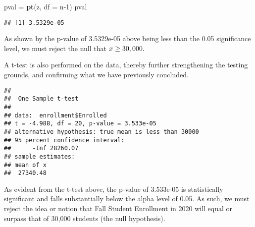 \documentclass[
]{article}
\newenvironment{Shaded}{\begin{snugshade}}{\end{snugshade}}
\newcommand{\CommentTok}[1]{\textcolor[rgb]{0.56,0.35,0.01}{\textit{#1}}}
\newcommand{\DataTypeTok}[1]{\textcolor[rgb]{0.13,0.29,0.53}{#1}}
\newcommand{\DecValTok}[1]{\textcolor[rgb]{0.00,0.00,0.81}{#1}}
\newcommand{\FloatTok}[1]{\textcolor[rgb]{0.00,0.00,0.81}{#1}}
\newcommand{\KeywordTok}[1]{\textcolor[rgb]{0.13,0.29,0.53}{\textbf{#1}}}
\newcommand{\NormalTok}[1]{#1}
\newcommand{\OperatorTok}[1]{\textcolor[rgb]{0.81,0.36,0.00}{\textbf{#1}}}
\newcommand{\StringTok}[1]{\textcolor[rgb]{0.31,0.60,0.02}{#1}}
\begin{document}
\begin{Shaded}
\begin{Highlighting}[]
\NormalTok{pval =}\StringTok{ }\KeywordTok{pt}\NormalTok{(z, }\DataTypeTok{df =}\NormalTok{ n}\DecValTok{-1}\NormalTok{)}
\NormalTok{pval}
\end{Highlighting}
\end{Shaded}

\begin{verbatim}
## [1] 3.5329e-05
\end{verbatim}

As shown by the p-value of 3.5329e-05 above being less than the 0.05
significance level, we must reject the null that
\(\small x \geq 30,000.\)

A t-test is also performed on the data, thereby further strengthening
the testing grounds, and confirming what we have previously concluded.

\begin{Shaded}
\end{Shaded}

\begin{verbatim}
## 
##  One Sample t-test
## 
## data:  enrollment$Enrolled
## t = -4.988, df = 20, p-value = 3.533e-05
## alternative hypothesis: true mean is less than 30000
## 95 percent confidence interval:
##      -Inf 28260.07
## sample estimates:
## mean of x 
##  27340.48
\end{verbatim}

As evident from the t-test above, the p-value of 3.533e-05 is
statistically significant and falls substantially below the alpha level
of 0.05. As such, we must reject the idea or notion that Fall Student
Enrollment in 2020 will equal or surpass that of 30,000 students (the
null hypothesis).
\end{document}
